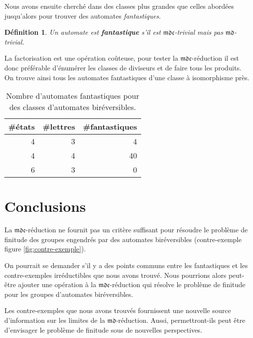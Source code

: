 \documentclass[11pt,a4paper]{article}
\newtheorem{definition}{Définition}
\begin{document}
Nous avons ensuite cherché dans des classes plus grandes que celles abordées jusqu'alors pour trouver des automates \textit{fantastiques}.

\begin{definition}
  Un automate est \textbf{\textit{fantastique}} s'il est $\mathfrak{mdc}$-trivial mais pas $\mathfrak{md}$-trivial.
\end{definition}

La factorisation est une opération coûteuse, pour tester la $\mathfrak{mdc}$-réduction il est donc préférable d'énumérer les classes de diviseurs et de faire tous les produits. On trouve ainsi tous les automates fantastiques d'une classe à isomorphisme près.

\begin{table}[h!]
  \begin{center}
    \begin{threeparttable}
      \begin{tabular}{|rrr|}
        \hline
        \#états & \#lettres & \#fantastiques \\ [0.5ex]
        \hline\hline
        \hline
        4 & 3 & 4 \\
        \hline
        4 & 4 & 40 \\
        \hline
        6 & 3 & 0 \\
        \hline
      \end{tabular}
      \caption{Nombre d'automates fantastiques pour des classes d'automates biréversibles.}
    \end{threeparttable}
  \end{center}
\end{table}

\newpage
\section{Conclusions}

La $\mathfrak{mdc}$-réduction ne fournit pas un critère suffisant pour résoudre le problème de finitude des groupes engendrés par des automates biréversibles (contre-exemple figure \ref{fig:contre-exemple}).

On pourrait se demander s'il y a des points communs entre les fantastiques et les contre-exemples irréductibles que nous avons trouvé. Nous pourrions alors peut-être ajouter une opération à la $\mathfrak{mdc}$-réduction qui résolve le problème de finitude pour les groupes d'automates biréversibles.

Les contre-exemples que nous avons trouvés fournissent une nouvelle source d'information sur les limites de la $\mathfrak{md}$-réduction. Aussi, permettront-ils peut être d'envisager le problème de finitude sous de nouvelles perspectives.

\newpage
{
  \nocite{*}
}

\end{document}
